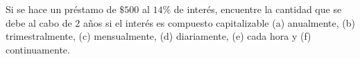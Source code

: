 \item Si se hace un préstamo de $\$500$ al $14\%$ de interés, encuentre la cantidad que se debe al cabo de $2$ años si el interés es compuesto capitalizable (a) anualmente, (b) trimestralmente, (c) mensualmente, (d) diariamente, (e) cada hora y (f) continuamente.
